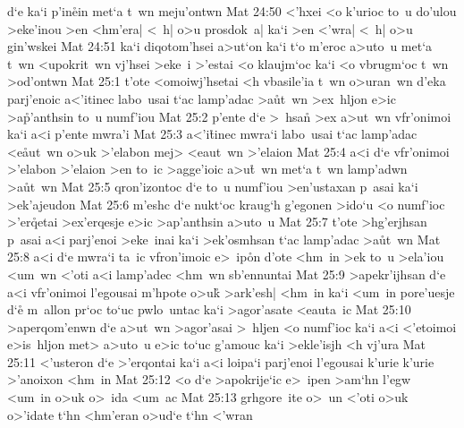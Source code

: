 d`e
ka`i
p'in\r{e}in
met`a
t~wn
meju'ontwn\bibvsend
\vs Mat 24:50
<'hxei
<o
k'urioc
to~u
do'ulou
>eke'inou
>en
<hm'era|
<~h|
o>u
prosdok~a|
ka`i
>en
<'wra|
<~h|
o>u
gin'wskei\bibvsend
\vs Mat 24:51
ka`i
diqotom'hsei
a>ut`on
ka`i
t`o
m'eroc
a>uto~u
met`a
t~wn
<upokrit~wn
vj'hsei
>eke~i
>'estai
<o
klaujm`oc
ka`i
<o
vbrugm`oc
t~wn
>od'ontwn\bibvsend
\vs Mat 25:1
t'ote
<omoiwj'hsetai
<h
vbasile'ia
t~wn
o>uran~wn
d'eka
parj'enoic
a<'itinec
labo~usai
t`ac
lamp'adac
>a\r{u}t~wn
>ex~hljon
e>ic
>a\r{p}'an\-th\-sin
to~u
numf'iou\bibvsend
\vs Mat 25:2
p'ente
d`e
>~hsan\r{}
>ex
a>ut~wn
vfr'onimoi
ka`i
a<i
p'ente
mwra'i\bibvsend
\vs Mat 25:3
a<'i\r{t}inec
mwra`i
labo~usai
t`ac
lamp'adac
<e\r{a}ut~wn
o>uk
>'elabon
mej>
<eaut~wn
>'elaion\bibvsend
\vs Mat 25:4
a<i
d`e
vfr'onimoi
>'elabon
>'elaion
>en
to~ic
>agge'ioic
a>u\r{t}~wn
met`a
t~wn
lamp'adwn
>a\r{u}t~wn\bibvsend
{}
\vs Mat 25:5
qron'izontoc
d`e
to~u
numf'iou
>en'ustaxan
p~asai
ka`i
>ek'ajeudon\bibvsend
\vs Mat 25:6
m'eshc
d`e
nukt`oc
kraug`h
g'egonen
>ido`u
<o
numf'ioc
>'er\r{q}etai
>ex'erqesje
e>ic
>ap'anthsin
a>uto~u\bibvsend
\vs Mat 25:7
t'ote
>hg'erjhsan
p~asai
a<i
parj'enoi
>eke~inai
ka`i
>ek'osmhsan
t`ac
lamp'adac
>a\r{u}t~wn\bibvsend
{}
\vs Mat 25:8
a<i
d`e
mwra`i
ta~ic
vfron'imoic
e>~ip\r{o}n
d'ote
<hm~in
>ek
to~u
>ela'iou
<um~wn
<'oti
a<i
lamp'adec
<hm~wn
sb'ennuntai\bibvsend
\vs Mat 25:9
>apekr'ijhsan
d`e
a<i
vfr'onimoi
l'egousai
m'hpote
o>u\r{k}
>ark'esh|
<hm~in
ka`i
<um~in
pore'uesje
d`e\r{}
m~allon
pr`oc
to`uc
pwlo~untac
ka`i
>agor'asate
<eauta~ic\bibvsend
\vs Mat 25:10
>aperqom'enwn
d`e
a>ut~wn
>agor'asai
>~hljen
<o
numf'ioc
ka`i
a<i
<'etoimoi
e>is~hljon
met>
a>uto~u
e>ic
to`uc
g'amouc
ka`i
>ekle'isjh
<h
vj'ura\bibvsend
\vs Mat 25:11
<'usteron
d`e
>'erqontai
ka`i
a<i
loipa`i
parj'enoi
l'egousai
k'urie
k'urie
>'anoixon
<hm~in\bibvsend
\vs Mat 25:12
<o
d`e
>apokrije`ic
e>~ipen
>am`hn
l'egw
<um~in
o>uk
o>~ida
<um~ac\bibvsend
\vs Mat 25:13
grhgore~ite
o>~un
<'oti
o>uk
o>'idate
t`hn
<hm'eran
o>ud`e
t`hn
<'wran
